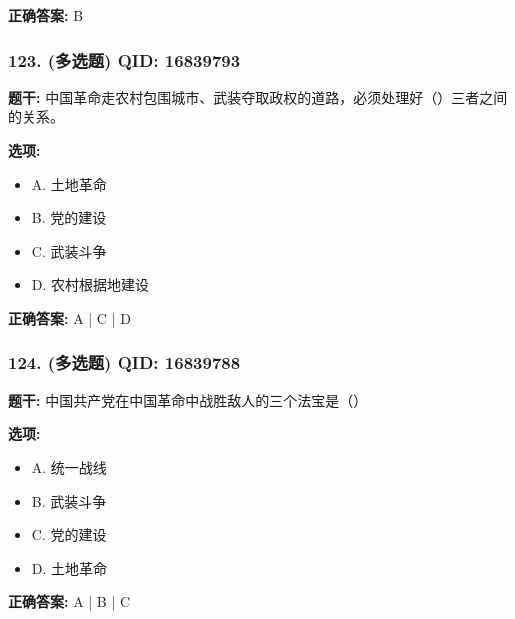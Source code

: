 \documentclass[12pt,UTF8]{ctexart}
\begin{document}
\textbf{正确答案:}
B

\vspace{0.3em}\hrulefill\vspace{0.7em}

\subsubsection*{123. (多选题) \small QID: 16839793}

\textbf{题干:}
中国革命走农村包围城市、武装夺取政权的道路，必须处理好（）三者之间的关系。

\textbf{选项:}
\begin{itemize}[leftmargin=*]

  \item A. 土地革命

  \item B. 党的建设

  \item C. 武装斗争

  \item D. 农村根据地建设

\end{itemize}

\textbf{正确答案:}
A | C | D

\vspace{0.3em}\hrulefill\vspace{0.7em}

\subsubsection*{124. (多选题) \small QID: 16839788}

\textbf{题干:}
中国共产党在中国革命中战胜敌人的三个法宝是（）

\textbf{选项:}
\begin{itemize}[leftmargin=*]

  \item A. 统一战线

  \item B. 武装斗争

  \item C. 党的建设

  \item D. 土地革命

\end{itemize}

\textbf{正确答案:}
A | B | C

\vspace{0.3em}\hrulefill\vspace{0.7em}
\end{document}
